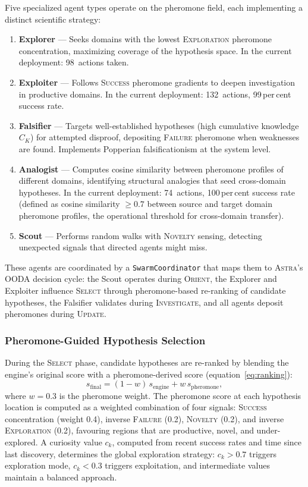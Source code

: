 \documentclass[usenatbib]{rasti}
\newcommand{\astra}{\textsc{Astra}\xspace}
\begin{document}
Five specialized agent types operate on the pheromone field, each implementing a distinct scientific strategy:
\begin{enumerate}
  \item \textbf{Explorer} --- Seeks domains with the lowest \textsc{Exploration} pheromone concentration, maximizing coverage of the hypothesis space. In the current deployment: 98~actions taken.
  \item \textbf{Exploiter} --- Follows \textsc{Success} pheromone gradients to deepen investigation in productive domains. In the current deployment: 132~actions, 99\,per\,cent success rate.
  \item \textbf{Falsifier} --- Targets well-established hypotheses (high cumulative knowledge $C_K$) for attempted disproof, depositing \textsc{Failure} pheromone when weaknesses are found. Implements Popperian falsificationism at the system level.
  \item \textbf{Analogist} --- Computes cosine similarity between pheromone profiles of different domains, identifying structural analogies that seed cross-domain hypotheses. In the current deployment: 74~actions, 100\,per\,cent success rate (defined as cosine similarity $\geq 0.7$ between source and target domain pheromone profiles, the operational threshold for cross-domain transfer).
  \item \textbf{Scout} --- Performs random walks with \textsc{Novelty} sensing, detecting unexpected signals that directed agents might miss.
\end{enumerate}
These agents are coordinated by a \texttt{SwarmCoordinator} that maps them to \astra's OODA decision cycle: the Scout operates during \textsc{Orient}, the Explorer and Exploiter influence \textsc{Select} through pheromone-based re-ranking of candidate hypotheses, the Falsifier validates during \textsc{Investigate}, and all agents deposit pheromones during \textsc{Update}.

\subsubsection{Pheromone-Guided Hypothesis Selection}

During the \textsc{Select} phase, candidate hypotheses are re-ranked by blending the engine's original score with a pheromone-derived score (equation~\ref{eq:ranking}):
\begin{equation}
  s_{\mathrm{final}} = (1 - w)\,s_{\mathrm{engine}} + w\,s_{\mathrm{pheromone}},
  \label{eq:ranking}
\end{equation}
where $w = 0.3$ is the pheromone weight.
The pheromone score at each hypothesis location is computed as a weighted combination of four signals: \textsc{Success} concentration (weight 0.4), inverse \textsc{Failure} (0.2), \textsc{Novelty} (0.2), and inverse \textsc{Exploration} (0.2), favouring regions that are productive, novel, and under-explored.
A curiosity value $c_k$, computed from recent success rates and time since last discovery, determines the global exploration strategy: $c_k > 0.7$ triggers exploration mode, $c_k < 0.3$ triggers exploitation, and intermediate values maintain a balanced approach.
\end{document}
